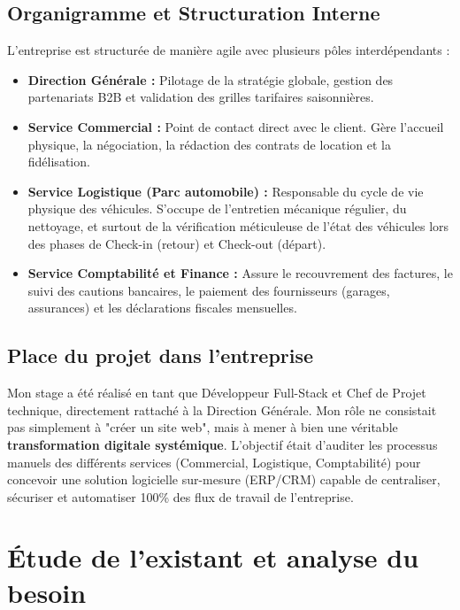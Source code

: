 \documentclass[12pt, a4paper]{report}
\begin{document}
\section{Organigramme et Structuration Interne}
L'entreprise est structurée de manière agile avec plusieurs pôles interdépendants :
\begin{itemize}
    \item \textbf{Direction Générale :} Pilotage de la stratégie globale, gestion des partenariats B2B et validation des grilles tarifaires saisonnières.
    \item \textbf{Service Commercial :} Point de contact direct avec le client. Gère l'accueil physique, la négociation, la rédaction des contrats de location et la fidélisation.
    \item \textbf{Service Logistique (Parc automobile) :} Responsable du cycle de vie physique des véhicules. S'occupe de l'entretien mécanique régulier, du nettoyage, et surtout de la vérification méticuleuse de l'état des véhicules lors des phases de Check-in (retour) et Check-out (départ).
    \item \textbf{Service Comptabilité et Finance :} Assure le recouvrement des factures, le suivi des cautions bancaires, le paiement des fournisseurs (garages, assurances) et les déclarations fiscales mensuelles.
\end{itemize}

\section{Place du projet dans l'entreprise}
Mon stage a été réalisé en tant que Développeur Full-Stack et Chef de Projet technique, directement rattaché à la Direction Générale. Mon rôle ne consistait pas simplement à "créer un site web", mais à mener à bien une véritable \textbf{transformation digitale systémique}. L'objectif était d'auditer les processus manuels des différents services (Commercial, Logistique, Comptabilité) pour concevoir une solution logicielle sur-mesure (ERP/CRM) capable de centraliser, sécuriser et automatiser 100\% des flux de travail de l'entreprise.

\chapter{Étude de l'existant et analyse du besoin}
\end{document}
